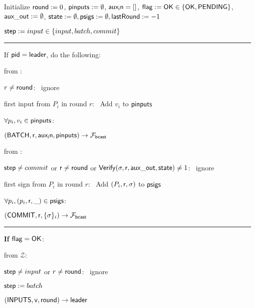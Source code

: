 \begin{bbox}[title={$\Pi_{\msf{state}} (\msf{sid}, \msf{pid}, U, \mathcal{C}_{\msf{aux}}, \mathcal{C}_{\msf{state}}, \msf{leader}, \msf{peers}=p_1,...p_n)$}]

Initialize ${\mathsf {round}} := 0$, ${\mathsf {pinputs}} := \emptyset$, ${\mathsf {aux_in}} = []$, ${\mathsf {flag}} := {\mathsf {OK}} \in \{{\mathsf {OK}},{\mathsf {PENDING}}\}$, ${\mathsf {aux\_out}} := \emptyset$, ${\mathsf {state}} := \emptyset, {\mathsf {psigs}} := \emptyset, {\mathsf {lastRound}} := -1$

${\mathsf {step}} := input \in \{input,batch,commit\}$

\vspace{2mm} \hrule \vspace{2mm}

If ${\mathsf {pid}} = {\mathsf {leader}}$, do the following:

\OnInput {} from \Partyi:

	\quad \If $r \neq {\mathsf {round}}$: \ ignore

	\quad \If first input from $P_i$ in round $r$: \ Add $v_i$ to ${\mathsf {pinputs}}$ 

	\quad \If $\forall p_i, v_i \in {\mathsf {pinputs}}$:
	
	\quad \quad \Send $({\mathsf {BATCH}}, {\mathsf {r}}, {\mathsf {aux_in}}, {\mathsf {pinputs}}) \rightarrow \mathcal{F}_{{\mathsf {bcast}}}$ 


\OnInput {} from \Partyi:

	\quad \If ${\mathsf {step}} \neq commit$ or ${\mathsf {r}} \neq {\mathsf {round}}$ or ${\mathsf {Verify}}(\sigma, {\mathsf {r}}, {\mathsf {aux\_out}}, {\mathsf {state}}) \neq 1$: \ ignore

	\quad \If first sign from $P_i$ in round $r$: \ Add $(P_i,{\mathsf {r}},\sigma)$ to ${\mathsf {psigs}}$

	\quad \If $\forall p_i, (p_i,{\mathsf {r}},\_) \in {\mathsf {psigs}}$:

	\quad \quad \Send $({\mathsf {COMMIT}}, {\mathsf {r}}, \{\sigma\}_{i}) \rightarrow \mathcal{F}_{{\mathsf {bcast}}}$


\vspace{2mm} \hrule \vspace{2mm}

{\bf If ${\mathsf {flag}} = {\mathsf {OK}}$}:

\OnInput {} from $\mathcal{Z}$:

	\quad \If ${\mathsf {step}} \neq input$ or $r \neq {\mathsf {round}}$: \ ignore

	\quad ${\mathsf {step}} := batch$ 

	\quad \Send $({\mathsf {INPUTS}}, {\mathsf {v}}, {\mathsf {round}}) \rightarrow {\mathsf {leader}}$ 


\end{bbox}
